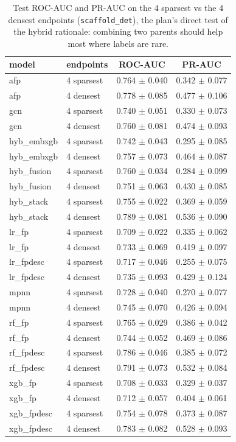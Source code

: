 \begin{table}[t]
\centering
\caption{Test ROC-AUC and PR-AUC on the 4 sparsest vs the 4 densest endpoints (\texttt{scaffold\_det}), the plan's direct test of the hybrid rationale: combining two parents should help most where labels are rare.}
\label{tab:hybrid-sparse}
\small
\begin{tabular}{llcc}
\toprule
model & endpoints & ROC-AUC & PR-AUC \\
\midrule
afp & 4 sparsest & 0.764 $\pm$ 0.040 & 0.342 $\pm$ 0.077 \\
afp & 4 densest & 0.778 $\pm$ 0.085 & 0.477 $\pm$ 0.106 \\
gcn & 4 sparsest & 0.740 $\pm$ 0.051 & 0.330 $\pm$ 0.073 \\
gcn & 4 densest & 0.760 $\pm$ 0.081 & 0.474 $\pm$ 0.093 \\
hyb\_embxgb & 4 sparsest & 0.742 $\pm$ 0.043 & 0.295 $\pm$ 0.085 \\
hyb\_embxgb & 4 densest & 0.757 $\pm$ 0.073 & 0.464 $\pm$ 0.087 \\
hyb\_fusion & 4 sparsest & 0.760 $\pm$ 0.034 & 0.284 $\pm$ 0.099 \\
hyb\_fusion & 4 densest & 0.751 $\pm$ 0.063 & 0.430 $\pm$ 0.085 \\
hyb\_stack & 4 sparsest & 0.755 $\pm$ 0.022 & 0.369 $\pm$ 0.059 \\
hyb\_stack & 4 densest & 0.789 $\pm$ 0.081 & 0.536 $\pm$ 0.090 \\
lr\_fp & 4 sparsest & 0.709 $\pm$ 0.022 & 0.335 $\pm$ 0.062 \\
lr\_fp & 4 densest & 0.733 $\pm$ 0.069 & 0.419 $\pm$ 0.097 \\
lr\_fpdesc & 4 sparsest & 0.717 $\pm$ 0.046 & 0.255 $\pm$ 0.075 \\
lr\_fpdesc & 4 densest & 0.735 $\pm$ 0.093 & 0.429 $\pm$ 0.124 \\
mpnn & 4 sparsest & 0.728 $\pm$ 0.040 & 0.270 $\pm$ 0.077 \\
mpnn & 4 densest & 0.745 $\pm$ 0.070 & 0.426 $\pm$ 0.094 \\
rf\_fp & 4 sparsest & 0.765 $\pm$ 0.029 & 0.386 $\pm$ 0.042 \\
rf\_fp & 4 densest & 0.744 $\pm$ 0.052 & 0.469 $\pm$ 0.086 \\
rf\_fpdesc & 4 sparsest & 0.786 $\pm$ 0.046 & 0.385 $\pm$ 0.072 \\
rf\_fpdesc & 4 densest & 0.791 $\pm$ 0.073 & 0.532 $\pm$ 0.084 \\
xgb\_fp & 4 sparsest & 0.708 $\pm$ 0.033 & 0.329 $\pm$ 0.037 \\
xgb\_fp & 4 densest & 0.712 $\pm$ 0.057 & 0.404 $\pm$ 0.061 \\
xgb\_fpdesc & 4 sparsest & 0.754 $\pm$ 0.078 & 0.373 $\pm$ 0.087 \\
xgb\_fpdesc & 4 densest & 0.783 $\pm$ 0.082 & 0.528 $\pm$ 0.093 \\
\bottomrule
\end{tabular}
\end{table}

